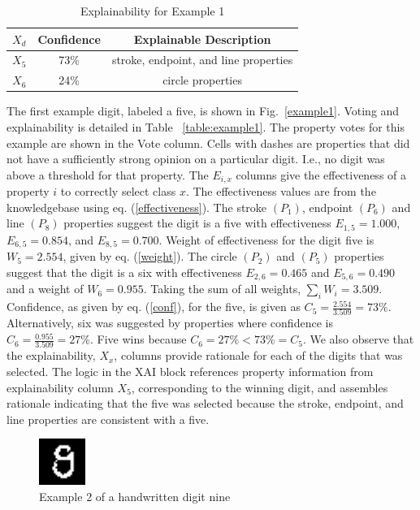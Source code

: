 \documentclass[conference]{IEEEtran}
\begin{document}
\begin{table}[htbp]
\caption{Explainability for Example 1}
\centering
\begin{tabular}{| c | c | c |}
\hline
 $X_d$ & Confidence & Explainable Description \\
\hline \cline{1-3}
$X_5$ & 73\% & stroke, endpoint, and line properties \\ 
\hline
$X_6$ & 24\% & circle properties \\
\hline
\end{tabular}
\label{table:exexample1}
\end{table}

The first example digit, labeled a five, is shown in Fig.~\ref{example1}.  Voting and explainability is detailed in Table ~\ref{table:example1}.  The property votes for this example are shown in the Vote column.  Cells with dashes are properties that did not have a sufficiently strong opinion on a particular digit.  I.e., no digit was above a threshold for that property.   The $E_{i,x}$ columns give the effectiveness of a property $i$ to correctly select class $x$.  The effectiveness values are from the knowledgebase using eq. (\ref{effectiveness}).   The stroke $(P_1)$, endpoint $(P_6)$ and line $(P_8)$ properties suggest the digit is a five with effectiveness $E_{1,5}= 1.000$, $E_{6,5}=0.854$, and $E_{8,5}=0.700$.  Weight of effectiveness for the digit five is $W_5=2.554$, given by eq. (\ref{weight}).  The circle $(P_2)$ and $(P_5)$ properties suggest that the digit is a six with effectiveness $E_{2,6}=0.465$ and $E_{5,6}=0.490$  and a weight of $W_6=0.955$.  Taking the sum of all weights, $\sum\limits_i W_i=3.509$.  Confidence, as given by eq. (\ref{conf}), for the five, is given as $C_5=\frac{2.554}{3.509} = 73\%$.  Alternatively, six was suggested by properties where confidence is $C_6=\frac{0.955}{3.509}=27\%$.  Five wins because $C_6=27\% < 73\%=C_5$.  We also observe that the explainability, $X_x$, columns provide rationale for each of the digits that was selected.  The logic in the XAI block references property information from explainability column $X_5$, corresponding to the winning digit, and assembles rationale indicating that the five was selected because the stroke, endpoint, and line properties are consistent with a five. 

 \begin{figure}[htbp]
\centerline{\includegraphics[width=15mm]{./digit-images/9-9.png}}
\caption{Example 2 of a handwritten digit nine}
\label{example2}
\end{figure}
\end{document}
